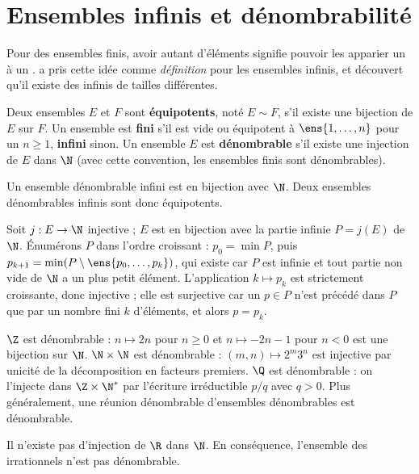 \section{Ensembles infinis et dénombrabilité}
\begin{intuition}
Pour des ensembles finis, \og avoir autant d'éléments \fg{} signifie \og pouvoir les apparier un à un \fg.  a pris cette idée comme \emph{définition} pour les ensembles infinis, et découvert qu'il existe des infinis de tailles différentes.
\end{intuition}
\begin{definition}
Deux ensembles $E$ et $F$ sont \textbf{équipotents}, noté $E\sim F$, s'il existe une bijection de $E$ sur $F$. Un ensemble est \textbf{fini} s'il est vide ou équipotent à $\ens{1,\dots,n}$ pour un $n\ge1$, \textbf{infini} sinon. Un ensemble $E$ est \textbf{dénombrable} s'il existe une injection de $E$ dans $\N$ (avec cette convention, les ensembles finis sont dénombrables).
\end{definition}
\begin{proposition}\label{prop-denombrable-infini}
Un ensemble dénombrable infini est en bijection avec $\N$. Deux ensembles dénombrables infinis sont donc équipotents.
\end{proposition}
\begin{preuve}
Soit $j:E\to\N$ injective ; $E$ est en bijection avec la partie infinie $P=j(E)$ de $\N$. Énumérons $P$ dans l'ordre croissant : $p_0=\min P$, puis $p_{k+1}=\min(P\setminus\ens{p_0,\dots,p_k})$, qui existe car $P$ est infinie et tout partie non vide de $\N$ a un plus petit élément. L'application $k\mapsto p_k$ est strictement croissante, donc injective ; elle est surjective car un $p\in P$ n'est précédé dans $P$ que par un nombre fini $k$ d'éléments, et alors $p=p_k$.
\end{preuve}
\begin{exemple}
$\Z$ est dénombrable : $n\mapsto 2n$ pour $n\ge0$ et $n\mapsto -2n-1$ pour $n<0$ est une bijection sur $\N$. $\N\times\N$ est dénombrable : $(m,n)\mapsto 2^m3^n$ est injective par unicité de la décomposition en facteurs premiers. $\Q$ est dénombrable : on l'injecte dans $\Z\times\N^*$ par l'écriture irréductible $p/q$ avec $q>0$. Plus généralement, une réunion dénombrable d'ensembles dénombrables est dénombrable.
\end{exemple}
\begin{theoreme}\label{thm-cantor-R}
Il n'existe pas d'injection de $\R$ dans $\N$. En conséquence, l'ensemble des irrationnels n'est pas dénombrable.
\end{theoreme}
